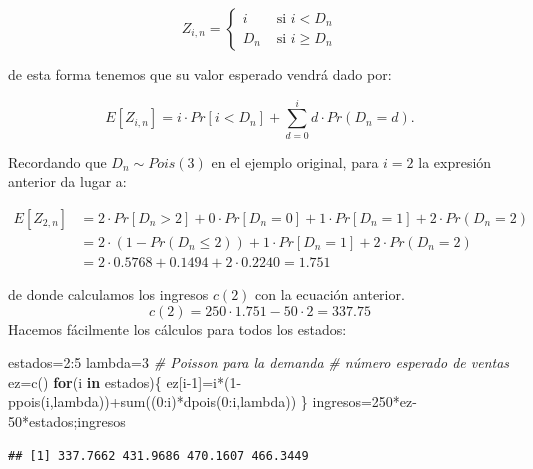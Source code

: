\documentclass[
]{book}
\newenvironment{Shaded}{\begin{snugshade}}{\end{snugshade}}
\newcommand{\CommentTok}[1]{\textcolor[rgb]{0.56,0.35,0.01}{\textit{#1}}}
\newcommand{\ControlFlowTok}[1]{\textcolor[rgb]{0.13,0.29,0.53}{\textbf{#1}}}
\newcommand{\DecValTok}[1]{\textcolor[rgb]{0.00,0.00,0.81}{#1}}
\newcommand{\FunctionTok}[1]{\textcolor[rgb]{0.00,0.00,0.00}{#1}}
\newcommand{\NormalTok}[1]{#1}
\newcommand{\OtherTok}[1]{\textcolor[rgb]{0.56,0.35,0.01}{#1}}
\newcommand{\SpecialCharTok}[1]{\textcolor[rgb]{0.00,0.00,0.00}{#1}}
\theoremstyle{definition}
\theoremstyle{definition}
\theoremstyle{definition}
\theoremstyle{definition}
\theoremstyle{remark}
\begin{document}
\begin{equation*}
Z_{i,n} =  
\begin{cases}
i & \text{ si } i <D_n \\
D_n & \text{ si } i \geq  D_n 
\end{cases}
\end{equation*}

de esta forma tenemos que su valor esperado vendrá dado por:

\[E[Z_{i,n}] = i \cdot Pr[i < D_n] + \sum_{d=0}^{i} d \cdot Pr(D_n=d).\]

Recordando que \(D_n\sim Pois(3)\) en el ejemplo original, para \(i=2\) la expresión anterior da lugar a:

\begin{eqnarray*}
E[Z_{2,n}] &= 2 \cdot Pr[D_n > 2] + 0 \cdot Pr[D_n = 0] + 1 \cdot Pr[D_n =1] +2 \cdot Pr(D_n=2) \\
&= 2 \cdot (1-Pr(D_n \leq 2)) + 1 \cdot Pr[D_n =1] + 2 \cdot Pr(D_n=2) \\
&= 2 \cdot 0.5768 +0.1494 +2 \cdot 0.2240 = 1.751
\end{eqnarray*}

de donde calculamos los ingresos \(c(2)\) con la ecuación anterior.
\[c(2) =  250 \cdot 1.751 -50 \cdot 2 = 337.75\]
Hacemos fácilmente los cálculos para todos los estados:

\begin{Shaded}
\begin{Highlighting}[]
\NormalTok{estados}\OtherTok{=}\DecValTok{2}\SpecialCharTok{:}\DecValTok{5}
\NormalTok{lambda}\OtherTok{=}\DecValTok{3}   \CommentTok{\# Poisson para la demanda}
\CommentTok{\# número esperado de ventas}
\NormalTok{ez}\OtherTok{=}\FunctionTok{c}\NormalTok{()}
\ControlFlowTok{for}\NormalTok{(i }\ControlFlowTok{in}\NormalTok{ estados)\{}
\NormalTok{ez[i}\DecValTok{{-}1}\NormalTok{]}\OtherTok{=}\NormalTok{i}\SpecialCharTok{*}\NormalTok{(}\DecValTok{1}\SpecialCharTok{{-}}\FunctionTok{ppois}\NormalTok{(i,lambda))}\SpecialCharTok{+}\FunctionTok{sum}\NormalTok{((}\DecValTok{0}\SpecialCharTok{:}\NormalTok{i)}\SpecialCharTok{*}\FunctionTok{dpois}\NormalTok{(}\DecValTok{0}\SpecialCharTok{:}\NormalTok{i,lambda))}
\NormalTok{\}}
\NormalTok{ingresos}\OtherTok{=}\DecValTok{250}\SpecialCharTok{*}\NormalTok{ez}\DecValTok{{-}50}\SpecialCharTok{*}\NormalTok{estados;ingresos}
\end{Highlighting}
\end{Shaded}

\begin{verbatim}
## [1] 337.7662 431.9686 470.1607 466.3449
\end{verbatim}
\end{document}
